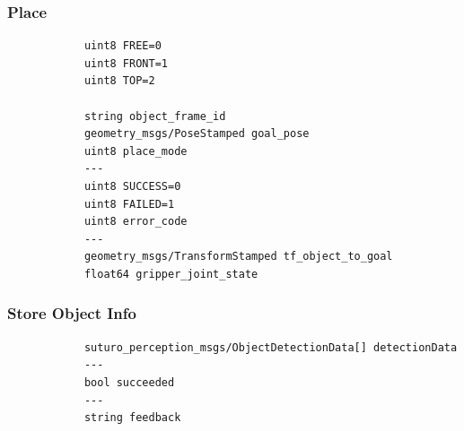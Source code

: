 \documentclass[main.tex]{subfiles}
\begin{document}
			\subsubsection{Place}
			\begin{lstlisting}
			uint8 FREE=0
			uint8 FRONT=1
			uint8 TOP=2
	
			string object_frame_id
			geometry_msgs/PoseStamped goal_pose
			uint8 place_mode
			---
			uint8 SUCCESS=0
			uint8 FAILED=1
			uint8 error_code
			---
			geometry_msgs/TransformStamped tf_object_to_goal
			float64 gripper_joint_state
			\end{lstlisting}
			\subsubsection{Store Object Info}
			\begin{lstlisting}
			suturo_perception_msgs/ObjectDetectionData[] detectionData
			---
			bool succeeded
			---
			string feedback
			\end{lstlisting}
		

	  		 

	\endgroup
\end{document}
